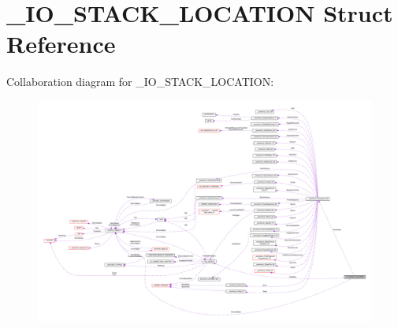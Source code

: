\hypertarget{struct__IO__STACK__LOCATION}{}\section{\+\_\+\+I\+O\+\_\+\+S\+T\+A\+C\+K\+\_\+\+L\+O\+C\+A\+T\+I\+O\+N Struct Reference}
\label{struct__IO__STACK__LOCATION}


Collaboration diagram for \+\_\+\+I\+O\+\_\+\+S\+T\+A\+C\+K\+\_\+\+L\+O\+C\+A\+T\+I\+O\+N\+:
\nopagebreak
\begin{figure}[H]
\begin{center}
\leavevmode
\includegraphics[width=350pt]{struct__IO__STACK__LOCATION__coll__graph}
\end{center}
\end{figure}
